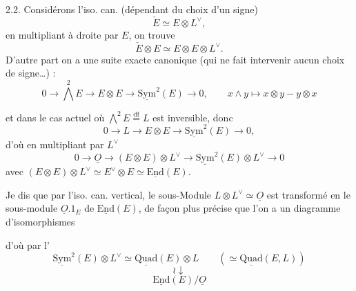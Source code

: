 \documentclass[11pt,a4paper]{article}
\begin{document}
2.2. Considérons  l'iso. can. (dépendant du choix d'un signe)
\[
  \check E \simeq E \otimes L^\vee ,
\]
en \add{$\otimes$-}multipliant à droite par $E$, on trouve
\[
  \check E \otimes E \simeq E \otimes E \otimes L^\vee .
\]
D'autre part  on a une suite exacte canonique (qui ne fait intervenir aucun choix de signe…) :
\[
  0 \to \textstyle\bigwedge^2 E \longrightarrow E \otimes E \longrightarrow \underline{\mathrm{Sym}}^2(E) \to 0 ,
  \qquad x \wedge y \longmapsto x \otimes y - y \otimes x
\]

et dans le cas actuel où $\bigwedge^2 E \overset{\mathrm{df}}{=} L$ est inversible,  donc
\[
  0 \to L \longrightarrow E \otimes E \longrightarrow \underline{\mathrm{Sym}}^2(E) \to 0 ,
\]
d'où en multipliant par $L^\vee$
\[
  0 \to \underline{O} \longrightarrow (E \otimes E) \otimes L^\vee \longrightarrow \underline{\mathrm{Sym}}^2(E) \otimes L^\vee \to 0
\]
avec $(E \otimes E) \otimes L^\vee \simeq E^\vee \otimes E \simeq \underline{\mathrm{End}}(E)$.

Je dis que par l'iso. can. vertical, le sous-Module $L \otimes L^\vee \simeq \underline{O}$ est transformé en le sous-module $\underline{O}.1_E$ de $\underline{\mathrm{End}}(E)$, de façon plus précise que l'on a un diagramme  d'isomorphismes



d'où par \ill{} l' \ill{}
\[
  \underline{\mathrm{Sym}}^2(E) \otimes L^\vee \simeq \underline{\mathrm{Quad}}(E) \otimes L \qquad (\simeq \underline{\mathrm{Quad}}(E, L))
\]
\[
  \wr\!\downarrow
\]
\[
  \underline{\mathrm{End}}(E)/\underline{O}
\]
\end{document}
